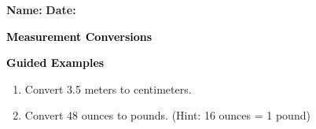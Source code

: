 \documentclass[12pt, letterpaper, fleqn]{article}
\begin{document}
\textbf{Name:} \underline{\hspace{5cm}}
\hfill
\textbf{Date:} \underline{\hspace{3cm}}\\

\begin{tcolorbox}[colback=customteal!20]
    \large\textcolor{black}{\textbf{Measurement Conversions}}
\end{tcolorbox}
\newpage
\begin{tcolorbox}[colback=customteal!20]
    \large\textcolor{black}{\textbf{Guided Examples}}
\end{tcolorbox}
\begin{enumerate}[itemsep=3.5cm, leftmargin=0.6cm]
\item Convert 3.5 meters to centimeters.
\vspace{3cm}
\item Convert 48 ounces to pounds. (Hint: 16 ounces = 1 pound)
\end{enumerate}
\end{document}

